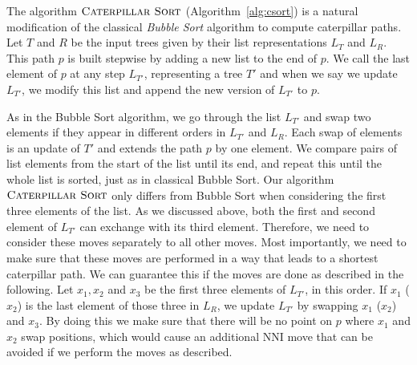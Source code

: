 \documentclass{amsart}
\newcommand{\nni}{\mathrm{NNI}}
\newcommand{\rnni}{\mathrm{RNNI}}
\newcommand{\csort}{\textsc{Caterpillar Sort}}
\begin{document}

The algorithm $\csort$ (Algorithm~\ref{alg:csort}) is a natural modification of the classical \emph{Bubble Sort} algorithm \autocite{Knuth1997-pi} to compute caterpillar paths.
Let $T$ and $R$ be the input trees given by their list representations $L_T$ and $L_R$.
This path $p$ is built stepwise by adding a new list to the end of $p$.
We call the last element of $p$ at any step $L_{T'}$, representing a tree $T'$ and when we say we update $L_{T'}$, we modify this list and append the new version of $L_{T'}$ to $p$.

As in the Bubble Sort algorithm, we go through the list $L_{T'}$ and swap two elements if they appear in different orders in $L_{T'}$ and $L_R$.
Each swap of elements is an update of $T'$ and extends the path $p$ by one element.
We compare pairs of list elements from the start of the list until its end, and repeat this until the whole list is sorted, just as in classical Bubble Sort.
Our algorithm $\csort$ only differs from Bubble Sort when considering the first three elements of the list.
As we discussed above, both the first and second element of $L_{T'}$ can exchange with its third element.
Therefore, we need to consider these moves separately to all other moves.
Most importantly, we need to make sure that these moves are performed in a way that leads to a shortest caterpillar path.
We can guarantee this if the moves are done as described in the following.
Let $x_1, x_2$ and $x_3$ be the first three elements of $L_{T'}$, in this order.
If $x_1$ ($x_2$) is the last element of those three in $L_R$, we update $L_{T'}$ by swapping $x_1$ ($x_2$) and $x_3$.
By doing this we make sure that there will be no point on $p$ where $x_1$ and $x_2$ swap positions, which would cause an additional $\nni$ move that can be avoided if we perform the moves as described.
\end{document}
